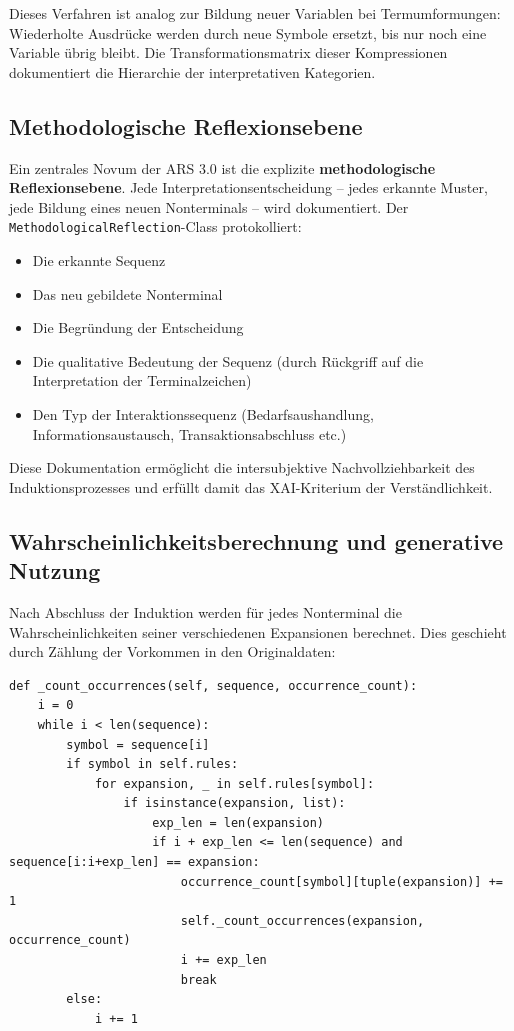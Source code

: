 \documentclass[
  12pt,
  a4paper,
  oneside,
  titlepage
]{article}
\begin{document}
Dieses Verfahren ist analog zur Bildung neuer Variablen bei Termumformungen: 
Wiederholte Ausdrücke werden durch neue Symbole ersetzt, bis nur noch eine 
Variable übrig bleibt. Die Transformationsmatrix dieser Kompressionen dokumentiert 
die Hierarchie der interpretativen Kategorien.

\subsection{Methodologische Reflexionsebene}

Ein zentrales Novum der ARS 3.0 ist die explizite \textbf{methodologische 
Reflexionsebene}. Jede Interpretationsentscheidung – jedes erkannte Muster, jede 
Bildung eines neuen Nonterminals – wird dokumentiert. Der \texttt{MethodologicalReflection}-Class 
protokolliert:

\begin{itemize}
    \item Die erkannte Sequenz
    \item Das neu gebildete Nonterminal
       \item Die Begründung der Entscheidung
    \item Die qualitative Bedeutung der Sequenz (durch Rückgriff auf die 
    Interpretation der Terminalzeichen)
    \item Den Typ der Interaktionssequenz (Bedarfsaushandlung, Informationsaustausch, 
    Transaktionsabschluss etc.)
\end{itemize}

Diese Dokumentation ermöglicht die intersubjektive Nachvollziehbarkeit des 
Induktionsprozesses und erfüllt damit das XAI-Kriterium der Verständlichkeit.

\subsection{Wahrscheinlichkeitsberechnung und generative Nutzung}

Nach Abschluss der Induktion werden für jedes Nonterminal die 
Wahrscheinlichkeiten seiner verschiedenen Expansionen berechnet. Dies geschieht 
durch Zählung der Vorkommen in den Originaldaten:

\begin{lstlisting}[caption=Zählung der Vorkommen für Wahrscheinlichkeiten]
def _count_occurrences(self, sequence, occurrence_count):
    i = 0
    while i < len(sequence):
        symbol = sequence[i]
        if symbol in self.rules:
            for expansion, _ in self.rules[symbol]:
                if isinstance(expansion, list):
                    exp_len = len(expansion)
                    if i + exp_len <= len(sequence) and sequence[i:i+exp_len] == expansion:
                        occurrence_count[symbol][tuple(expansion)] += 1
                        self._count_occurrences(expansion, occurrence_count)
                        i += exp_len
                        break
        else:
            i += 1
\end{lstlisting}
\end{document}
